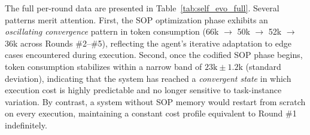 The full per-round data are presented in Table~\ref{tab:self_evo_full}. Several patterns merit attention. First, the SOP optimization phase exhibits an \emph{oscillating convergence} pattern in token consumption (66k $\rightarrow$ 50k $\rightarrow$ 52k $\rightarrow$ 36k across Rounds \#2--\#5), reflecting the agent's iterative adaptation to edge cases encountered during execution. Second, once the codified SOP phase begins, token consumption stabilizes within a narrow band of $23\text{k} \pm 1.2\text{k}$ (standard deviation), indicating that the system has reached a \emph{convergent state} in which execution cost is highly predictable and no longer sensitive to task-instance variation. By contrast, a system without SOP memory would restart from scratch on every execution, maintaining a constant cost profile equivalent to Round \#1 indefinitely.

\begin{table}[h]
\centering
\caption{Per-round statistics for Study I. Cache-read tokens dominate Round \#1 due to extensive exploratory context construction.}
\label{tab:self_evo_full}
\end{table}

